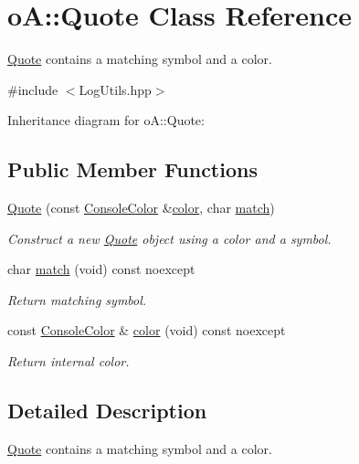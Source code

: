 \hypertarget{classo_a_1_1_quote}{}\section{oA\+:\+:Quote Class Reference}
\label{classo_a_1_1_quote}


\mbox{\hyperlink{classo_a_1_1_quote}{Quote}} contains a matching symbol and a color.  




{\ttfamily \#include $<$Log\+Utils.\+hpp$>$}



Inheritance diagram for oA\+:\+:Quote\+:
\subsection*{Public Member Functions}
\begin{DoxyCompactItemize}
\item 
\mbox{\hyperlink{classo_a_1_1_quote_a106d98164983c0d65e8b181275ab763b}{Quote}} (const \mbox{\hyperlink{namespaceo_a_a747e07c1977a29f3e1d38683043ec927}{Console\+Color}} \&\mbox{\hyperlink{classo_a_1_1_quote_a2230c25c43af7317d5ab5785b382f2ce}{color}}, char \mbox{\hyperlink{classo_a_1_1_quote_a3347e15b8ef676b7a5b2017b80e8befc}{match}})
\begin{DoxyCompactList}\small\item\em Construct a new \mbox{\hyperlink{classo_a_1_1_quote}{Quote}} object using a color and a symbol. \end{DoxyCompactList}\item 
char \mbox{\hyperlink{classo_a_1_1_quote_a3347e15b8ef676b7a5b2017b80e8befc}{match}} (void) const noexcept
\begin{DoxyCompactList}\small\item\em Return matching symbol. \end{DoxyCompactList}\item 
const \mbox{\hyperlink{namespaceo_a_a747e07c1977a29f3e1d38683043ec927}{Console\+Color}} \& \mbox{\hyperlink{classo_a_1_1_quote_a2230c25c43af7317d5ab5785b382f2ce}{color}} (void) const noexcept
\begin{DoxyCompactList}\small\item\em Return internal color. \end{DoxyCompactList}\end{DoxyCompactItemize}


\subsection{Detailed Description}
\mbox{\hyperlink{classo_a_1_1_quote}{Quote}} contains a matching symbol and a color. 

